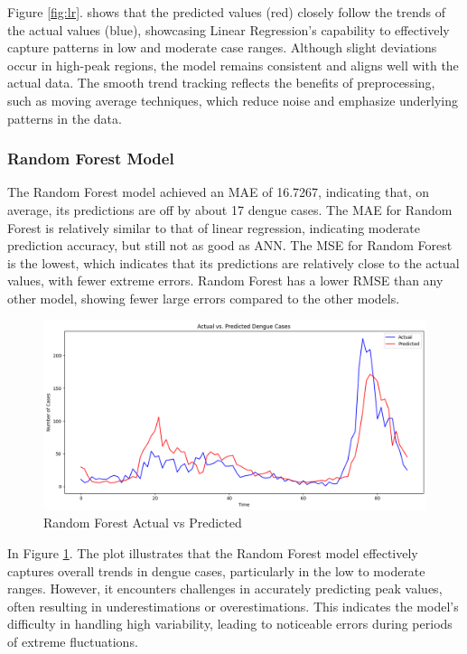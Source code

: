 \documentclass{article}
\begin{document}
Figure \ref{fig:lr}. shows that the predicted values (red) closely follow the trends of the actual values (blue), showcasing Linear Regression's capability to effectively capture patterns in low and moderate case ranges. Although slight deviations occur in high-peak regions, the model remains consistent and aligns well with the actual data. The smooth trend tracking reflects the benefits of preprocessing, such as moving average techniques, which reduce noise and emphasize underlying patterns in the data.

\subsubsection{Random Forest Model}
The Random Forest model achieved an MAE of 16.7267, indicating that, on average, its predictions are off by about 17 dengue cases. The MAE for Random Forest is relatively similar to that of linear regression, indicating moderate prediction accuracy, but still not as good as ANN. The MSE for Random Forest is the lowest, which indicates that its predictions are relatively close to the actual values, with fewer extreme errors. Random Forest has a lower RMSE than any other model, showing fewer large errors compared to the other models.


\begin{figure}[h!]
    \centering
    \includegraphics[width=1\linewidth]{image/Random Forest plot.png}
    \caption{Random Forest Actual vs Predicted}
    \label{fig:rf}
\end{figure}

In Figure \ref{fig:rf}. The plot illustrates that the Random Forest model effectively captures overall trends in dengue cases, particularly in the low to moderate ranges. However, it encounters challenges in accurately predicting peak values, often resulting in underestimations or overestimations. This indicates the model’s difficulty in handling high variability, leading to noticeable errors during periods of extreme fluctuations.
\end{document}
